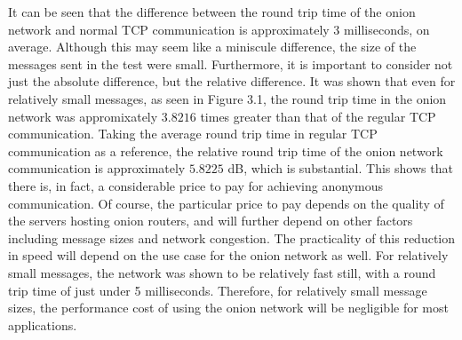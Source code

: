 \documentclass[10pt]{report}
\begin{document}
It can be seen that the difference between the round trip time of the onion network and normal TCP
communication is approximately 3 milliseconds, on average. Although this may seem like a miniscule
difference, the size of the messages sent in the test were small. Furthermore, it is important to
consider not just the absolute difference, but the relative difference. It was shown that even for
relatively small messages, as seen in Figure 3.1, the round trip time in the onion network was
appromixately $3.8216$ times greater than that of the regular TCP communication. Taking the average
round trip time in regular TCP communication as a reference, the relative round trip time of the
onion network communication is approximately $5.8225$ dB, which is substantial. This shows that
there is, in fact, a considerable price to pay for achieving anonymous communication. Of course, the
particular price to pay depends on the quality of the servers hosting onion routers, and will
further depend on other factors including message sizes and network congestion. The practicality of
this reduction in speed will depend on the use case for the onion network as well. For relatively
small messages, the network was shown to be relatively fast still, with a round trip time of just under 5
milliseconds. Therefore, for relatively small message sizes, the performance cost of using the onion
network will be negligible for most applications.
\end{document}
